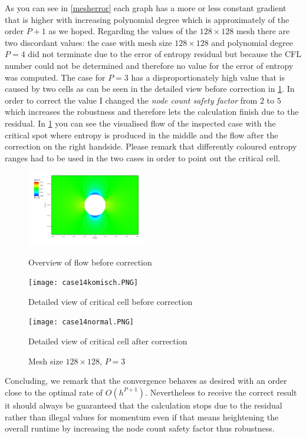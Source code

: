 	As you can see in \ref{mesherror} each graph has a more or less constant gradient that is higher with increasing polynomial degree which is approximately of the order $P+1$ as we hoped. Regarding the values of the $128 \times 128$ mesh there are two discordant values: the case with mesh size $128 \times 128$ and polynomial degree $P = 4$ did not terminate due to the error of entropy residual but because the CFL number could not be determined and therefore no value for the error of entropy was computed. The case for $P = 3$ has a disproportionately high value that is caused by two cells as can be seen in the detailed view before correction in \ref{fig:case14}. In order to correct the value I changed the \textit{node count safety factor} from $2$ to $5$ which increases the robustness and therefore lets the calculation finish due to the residual. In \ref{fig:case14} you can see the visualised flow of the inspected case with the critical spot where entropy is produced in the middle and the flow after the correction on the right handside. Please remark that differently coloured entropy ranges had to be used in the two cases in order to point out the critical cell.
	
	\begin{figure}[htp]
		\centering
		\begin{minipage}[b]{0.28\textwidth}
			\centering
			\includegraphics[height=3.3cm]{img/case14.PNG}
			\caption*{Overview of flow before correction}
		\end{minipage}
		\quad
		\begin{minipage}[b]{0.28\textwidth}
			\centering
			\texttt{[image: case14komisch.PNG]}
			\caption*{Detailed view of critical cell before correction}
			\label{fig:case14detail}
		\end{minipage}
		\quad
		\begin{minipage}[b]{0.28\textwidth}
			\centering
			\texttt{[image: case14normal.PNG]}
			\caption*{Detailed view of critical cell after correction}
			\label{fig:case14detailneu}
		\end{minipage}
		\caption{Mesh size $128 \times 128$, $P = 3$}
		\label{fig:case14}
	\end{figure}
	
	Concluding, we remark that the convergence behaves as desired with an order close to the optimal rate of $O(h^{P+1})$. Nevertheless to receive the correct result it should always be guaranteed that the calculation stops due to the residual rather than illegal values for momentum even if that means heightening the overall runtime by increasing the node count safety factor thus robustness.
	
